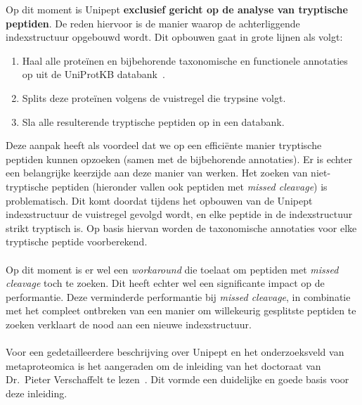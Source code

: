 Op dit moment is Unipept \textbf{exclusief gericht op de analyse van tryptische peptiden}.
De reden hiervoor is de manier waarop de achterliggende indexstructuur opgebouwd wordt.
Dit opbouwen gaat in grote lijnen als volgt:

\begin{enumerate}
    \item Haal alle proteïnen en bijbehorende taxonomische en functionele annotaties op uit de UniProtKB databank~\cite{UniprotKB}.
    \item Splits deze proteïnen volgens de vuistregel die trypsine volgt.
    \item Sla alle resulterende tryptische peptiden op in een databank.
\end{enumerate}

Deze aanpak heeft als voordeel dat we op een efficiënte manier tryptische peptiden kunnen opzoeken (samen met de bijbehorende annotaties).
Er is echter een belangrijke keerzijde aan deze manier van werken.
Het zoeken van niet-tryptische peptiden (hieronder vallen ook peptiden met \textit{missed cleavage}) is problematisch.
Dit komt doordat tijdens het opbouwen van de Unipept indexstructuur de vuistregel gevolgd wordt, en elke peptide in de indexstructuur strikt tryptisch is.
Op basis hiervan worden de taxonomische annotaties voor elke tryptische peptide voorberekend.
\\ \\
Op dit moment is er wel een \textit{workaround} die toelaat om peptiden met \textit{missed cleavage} toch te zoeken.
Dit heeft echter wel een significante impact op de performantie.
Deze verminderde performantie bij \textit{missed cleavage}, in combinatie met het compleet ontbreken van een manier om willekeurig gesplitste peptiden te zoeken verklaart de nood aan een nieuwe indexstructuur.
\\ \\
Voor een gedetailleerdere beschrijving over Unipept en het onderzoeksveld van metaproteomica is het aangeraden om de inleiding van het doctoraat van Dr.~Pieter Verschaffelt te lezen~\cite{phdPieterUnipept}.
Dit vormde een duidelijke en goede basis voor deze inleiding.


